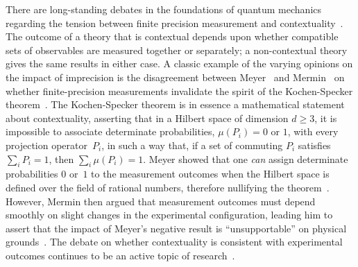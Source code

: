 \documentclass[english,reprint, aps, prl,superscriptaddress, showpacs,
showkeys, longbibliography, amsmath, amssymb, floatfix]{revtex4-1}
\theoremstyle{plain}
\theoremstyle{definition}
\begin{document}
There are long-standing debates in the foundations of quantum
mechanics regarding the tension between finite precision measurement
and contextuality~\cite{BarrettKent2004,Appleby_2005}. The outcome of
a theory that is contextual depends upon whether compatible sets of
observables are measured together or separately; a non-contextual
theory gives the same results in either case.  A classic example of
the varying opinions on the impact of imprecision is the disagreement
between Meyer~\cite{PhysRevLett.83.3751} and Mermin~\cite{Mermin1999}
on whether finite-precision measurements invalidate the spirit of the
Kochen-Specker
theorem~\cite{BELL_1966,kochenspecker1967,Redhead1987-REDINA,Mermin1990Simple,peres1995quantum,Jaeger2007,Held2016}.
The Kochen-Specker theorem is in essence a mathematical statement
about contextuality, asserting that in a Hilbert space of dimension
$d \ge 3$, it is impossible to associate determinate probabilities,
$\mu(P_i)= 0$ or $1$, with every projection operator~$P_i$, in such a
way that, if a set of commuting $P_i$ satisfies $\sum_i P_i = 1$, then
$\sum_i \mu(P_i) = 1$.  Meyer showed that one {\it can\/} assign
determinate probabilities $0$ or~$1$ to the measurement outcomes when
the Hilbert space is defined over the field of rational numbers,
therefore nullifying the theorem~\citep{PhysRevLett.83.3751}.
However, Mermin then argued that measurement outcomes must depend
smoothly on slight changes in the experimental configuration, leading
him to assert that the impact of Meyer's negative result is
``unsupportable'' on physical grounds~\citep{Mermin1999}.  The debate
on whether contextuality is consistent with experimental outcomes
continues to be an active topic of
research~\citep{Kent1999,HavlicekKrennSummhammerSvozil2001,SimonBruknerZeilinger2001,Cabello2002,Larsson2002,Appleby2002,BarrettKent2004,Appleby_2005,Spekkens2005,GuehneKleinmannCabelloEtAl2010,MazurekPuseyKunjwalEtAl2016}.
\end{document}
